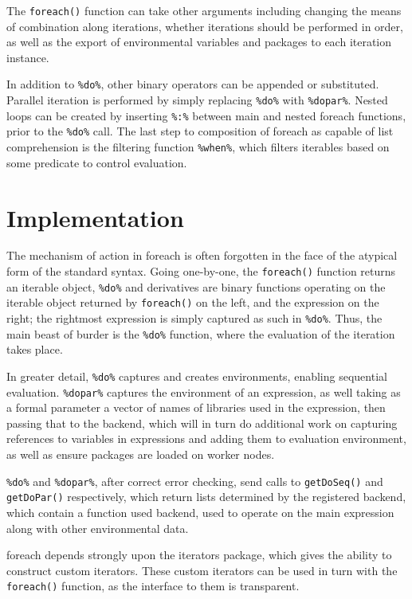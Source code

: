\documentclass[a4paper,10pt]{article}
\begin{document}
The \texttt{foreach()} function can take other arguments including
changing the means of combination along iterations, whether iterations
should be performed in order, as well as the export of environmental
variables and packages to each iteration instance.

In addition to \texttt{\%do\%}, other binary operators can be appended
or substituted. Parallel iteration is performed by simply replacing
\texttt{\%do\%} with \texttt{\%dopar\%}. Nested loops can be created
by inserting \texttt{\%:\%} between main and nested foreach functions,
prior to the \texttt{\%do\%} call\cite{weston19:_nestin_loops}. The
last step to composition of foreach as capable of list comprehension
is the filtering function \texttt{\%when\%}, which filters iterables
based on some predicate to control evaluation.


\section{Implementation}
\label{sec:implementation}

The mechanism of action in foreach is often forgotten in the face of
the atypical form of the standard syntax. Going one-by-one, the
\texttt{foreach()} function returns an iterable object,
\texttt{\%do\%} and derivatives are binary functions operating on the
iterable object returned by \texttt{foreach()} on the left, and the
expression on the right; the rightmost expression is simply captured
as such in \texttt{\%do\%}. Thus, the main beast of burder is the
\texttt{\%do\%} function, where the evaluation of the iteration takes
place.

In greater detail, \texttt{\%do\%} captures and creates environments, enabling
sequential evaluation. \texttt{\%dopar\%} captures the environment of an
expression, as well taking as a formal parameter a vector of names of libraries
used in the expression, then passing that to the backend, which will in turn do
additional work on capturing references to variables in expressions and adding
them to evaluation environment, as well as ensure packages are loaded on worker
nodes.

\texttt{\%do\%} and \texttt{\%dopar\%}, after correct error checking,
send calls to \texttt{getDoSeq()} and \texttt{getDoPar()}
respectively, which return lists determined by the registered backend,
which contain a function used backend, used to operate on the main
expression along with other environmental data.

foreach depends strongly upon the iterators package, which gives the
ability to construct custom iterators. These custom iterators can be
used in turn with the \texttt{foreach()} function, as the interface to
them is transparent.
\end{document}
